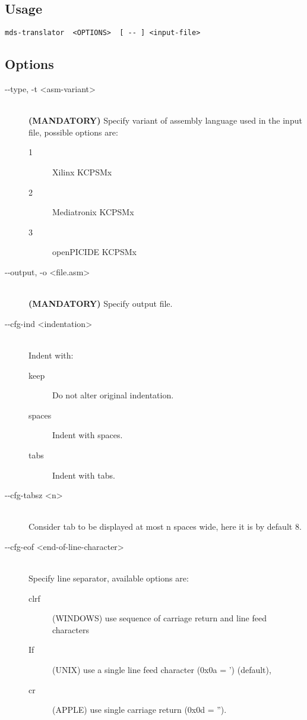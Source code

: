     \subsection{Usage}
        \verb'mds-translator  <OPTIONS>  [ -- ] <input-file>'

    \subsection{Options}
        \begin{description}
            \item[-{}-type, -t <asm-variant>]~\\
                \textbf{(MANDATORY)} Specify variant of assembly language used in the input file, possible options are:
                \begin{description}
                    \item [1] Xilinx KCPSMx
                    \item [2] Mediatronix KCPSMx
                    \item [3] openPICIDE KCPSMx
                \end{description}

            \item[-{}-output, -o <file.asm>]~\\
                \textbf{(MANDATORY)} Specify output file.

            \item[-{}-cfg-ind <indentation>]~\\
                Indent with:
                \begin{description}
                    \item [keep] Do not alter original indentation.
                    \item [spaces] Indent with spaces.
                    \item [tabs] Indent with tabs.
                \end{description}

            \item[-{}-cfg-tabsz <n>]~\\
                Consider tab to be displayed at most n spaces wide, here it is by default 8.

            \item[-{}-cfg-eof <end-of-line-character>]~\\
                Specify line separator, available options are:
                \begin{description}
                    \item [clrf] (WINDOWS) use sequence of carriage return and line feed characters
                    \item [If] (UNIX) use a single line feed character (0x0a = ') (default),
                    \item [cr] (APPLE) use single carriage return (0x0d = '').
                \end{description}


\end{description}
